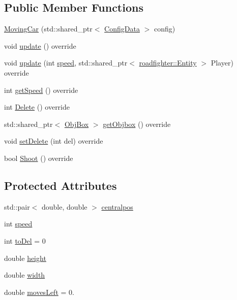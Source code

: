 \subsection*{Public Member Functions}
\begin{DoxyCompactItemize}
\item 
\hyperlink{classroadfighter_1_1MovingCar_a938e531ba0de68f564f188d55a59e138}{Moving\+Car} (std\+::shared\+\_\+ptr$<$ \hyperlink{classConfigData}{Config\+Data} $>$ config)
\item 
void \hyperlink{classroadfighter_1_1MovingCar_a06c6e2e0510707bdd7e4570b8f65241c}{update} () override
\item 
void \hyperlink{classroadfighter_1_1MovingCar_a62fbe61c5a1c1a1c0d376047ec1edcf2}{update} (int \hyperlink{classroadfighter_1_1MovingCar_aa11ffbdab47c7fdf1311cfe02f0d8bd7}{speed}, std\+::shared\+\_\+ptr$<$ \hyperlink{classroadfighter_1_1Entity}{roadfighter\+::\+Entity} $>$ Player) override
\item 
int \hyperlink{classroadfighter_1_1MovingCar_a42bdd9382e7234ae79d6f5e582adee92}{get\+Speed} () override
\item 
int \hyperlink{classroadfighter_1_1MovingCar_a97196aa72de773ac88d1df99c47a5367}{Delete} () override
\item 
std\+::shared\+\_\+ptr$<$ \hyperlink{structObjBox}{Obj\+Box} $>$ \hyperlink{classroadfighter_1_1MovingCar_a8b744958eaba45078e98fad4ac6821c3}{get\+Objbox} () override
\item 
void \hyperlink{classroadfighter_1_1MovingCar_a2fd9123a7ee59d4796672ad79656e1b5}{set\+Delete} (int del) override
\item 
bool \hyperlink{classroadfighter_1_1MovingCar_a5b7a6cf114fe26016434b2fcf3434d37}{Shoot} () override
\end{DoxyCompactItemize}
\subsection*{Protected Attributes}
\begin{DoxyCompactItemize}
\item 
std\+::pair$<$ double, double $>$ \hyperlink{classroadfighter_1_1MovingCar_abff584d4890e348c74f3ac3962d2df9c}{centralpos}
\item 
int \hyperlink{classroadfighter_1_1MovingCar_aa11ffbdab47c7fdf1311cfe02f0d8bd7}{speed}
\item 
int \hyperlink{classroadfighter_1_1MovingCar_a326ee7c0301dd03d570d3820612614ca}{to\+Del} = 0
\item 
double \hyperlink{classroadfighter_1_1MovingCar_aa8068e11ad7fa9311c0703b306119f53}{height}
\item 
double \hyperlink{classroadfighter_1_1MovingCar_af13dfca7a365dd785dbfc2c8446232a9}{width}
\item 
double \hyperlink{classroadfighter_1_1MovingCar_a60a80bd76b33c59a836a57606a19d7e6}{moves\+Left} = 0.
\end{DoxyCompactItemize}



